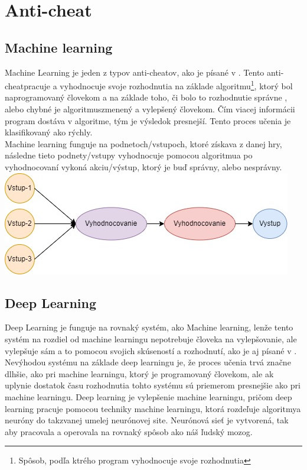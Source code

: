\documentclass[twoside,twocolumn]{article}
\begin{document}

\section{Anti-cheat}
\subsection{Machine learning}
Machine Learning je jeden z typov anti-cheatov\footnotemark[2], ako je písané v \cite{willman2020machine}. Tento anti-cheat\footnotemark[2] pracuje a vyhodnocuje svoje rozhodnutia na základe algoritmu\footnote[7]{Spôsob, podľa ktrého program vyhodnocuje svoje rozhodnutia}, ktorý bol naprogramovaný človekom a na základe toho, či bolo to rozhodnutie správne , alebo chybné je algoritmus\footnotemark[7] zmenený a vylepšený človekom. Čím viacej informácii program dostáva v algoritme\footnotemark[7], tým je výsledok presnejší. Tento proces učenia je klasifikovaný ako rýchly. \\
Machine learning funguje na podnetoch/vstupoch, ktoré získava z danej hry, následne tieto podnety/vstupy vyhodnocuje pomocou algoritmu\footnotemark[7] a po vyhodnocovaní vykoná akciu/výstup, ktorý je buď správny, alebo nesprávny.\\

\textnormal{\includegraphics[scale=0.42]{Machine learning proces diagram.jpg}}
\label{machine learning proces}


\subsection{Deep Learning}
Deep Learning je funguje na rovnaký systém, ako Machine learning, lenže tento systém na rozdiel od machine learningu nepotrebuje človeka na vylepšovanie, ale vylepšuje sám a to pomocou svojich skúseností a rozhodnutí, ako je aj písané v \cite{zhang2021improvement}. Nevýhodou systému na základe deep learningu je, že proces učenia trvá značne dlhšie, ako pri machine learningu, ktorý je programovaný človekom, ale ak uplynie dostatok času rozhodnutia tohto systému sú priemerom presnejšie ako pri machine learningu.
Deep learning je vylepšenie machine learningu, pričom deep learning pracuje pomocou techniky machine learningu, ktorá rozdeľuje algoritmy\footnotemark[7] a neuróny do takzvanej umelej neurónovej site. Neurónová sieť je vytvorená, tak aby pracovala a operovala na rovnaký spôsob ako náš ľudský mozog.
\end{document}
